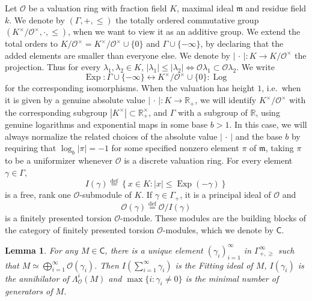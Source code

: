 \documentclass[11pt]{article}
\newtheorem{lemm}[theo]{Lemma}
\theoremstyle{definition}
\numberwithin{equation}{section}
\numberwithin{figure}{section}
\numberwithin{table}{section}
\DeclareMathOperator{\Exp}{Exp}
\DeclareMathOperator{\Log}{Log}
\newcommand{\eqd}{\stackrel{\mathrm{def}}{=}}
\newcommand{\sfC}{\mathsf{C}}
\begin{document}
Let $\mathcal{O}$ be a valuation ring with fraction field $K$, maximal ideal $\mathfrak{m}$ and residue field $k$. We denote by $(\Gamma,+,\leq)$ the totally ordered commutative group $(K^{\times}/\mathcal{O}^{\times},\cdot,\leq)$, when we want to view it as an additive group. We extend the total orders to $K/\mathcal{O}^{\times}=K^{\times}/\mathcal{O}^{\times}\cup\{0\}$ and $\Gamma\cup\{-\infty\}$, by declaring that the added elements are smaller than everyone else. We denote by $|{\,\cdot\,}|:K\rightarrow K/\mathcal{O}^{\times}$ the projection. Thus for every $\lambda_{1},\lambda_{2}\in K$, $\left|\lambda_{1}\right|\leq\left|\lambda_{2}\right|\iff\mathcal{O}\lambda_{1}\subset\mathcal{O}\lambda_{2}$. We write
\[
\Exp:\Gamma\cup\{-\infty\}\longleftrightarrow K^{\times}/\mathcal{O}^{\times}\cup\{0\}:\Log
\]
for the corresponding isomorphisms. When the valuation has height $1$, i.e.~when it is given by a genuine absolute value $|{\,\cdot\,}|:K\rightarrow\mathbb{R}_{+}$, we will identify $K^{\times}/\mathcal{O}^{\times}$ with the corresponding subgroup $\left|K^{\times}\right|\subset\mathbb{R}_{+}^{\times}$, and $\Gamma$ with a subgroup of $\mathbb{R}$, using genuine logarithms and exponential maps in some base $b>1$. In this case, we will always normalize the related choices of the absolute value $|{\,\cdot\,}|$ and the base $b$ by requiring that $\log_{b}\left|\pi\right|=-1$ for some specified nonzero element $\pi$ of $\mathfrak{m}$, taking $\pi$ to be a uniformizer whenever $\mathcal{O}$ is a discrete valuation ring. For every element $\gamma\in\Gamma$,
\[
I(\gamma)\eqd\left\{ x\in K:\left|x\right|\leq\Exp(-\gamma)\right\}
\]
is a free, rank one $\mathcal{O}$-submodule of $K$. If $\gamma\in\Gamma_{+}$, it is a principal ideal of $\mathcal{O}$ and
\[
\mathcal{O}(\gamma)\eqd\mathcal{O}/I(\gamma)
\]
is a finitely presented torsion $\mathcal{O}$-module. These modules are the building blocks of the category of finitely presented torsion $\mathcal{O}$-modules, which we denote by $\sfC$.

\begin{lemm}\label{lem:DefInvTorsionOmod}
For any $M\in\sfC$, there is a unique element $(\gamma_{i})_{i=1}^{\infty}$ in $\Gamma_{+,\geq}^{\infty}$ such that $M\simeq\bigoplus_{i=1}^{\infty}\mathcal{O}(\gamma_{i})$. Then $I(\sum_{i=1}^{\infty}\gamma_{i})$ is the Fitting ideal of $M$, $I(\gamma_{i})$ is the annihilator of $\Lambda_{\mathcal{O}}^{i}(M)$ and $\max\{i:\gamma_{i}\neq0\}$ is the minimal number of generators of $M$.
\end{lemm}
\end{document}

